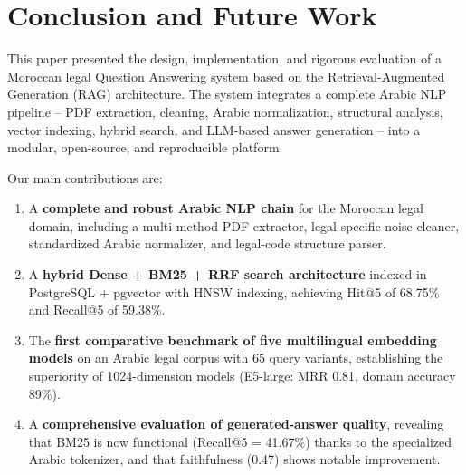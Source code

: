 \section{Conclusion and Future Work}
\label{sec:conclusion}

This paper presented the design, implementation, and rigorous evaluation of a
Moroccan legal Question Answering system based on the Retrieval-Augmented
Generation (RAG) architecture. The system integrates a complete Arabic NLP
pipeline -- PDF extraction, cleaning, Arabic normalization, structural
analysis, vector indexing, hybrid search, and LLM-based answer generation --
into a modular, open-source, and reproducible platform.

Our main contributions are:
\begin{enumerate}
  \item A \textbf{complete and robust Arabic NLP chain} for the Moroccan legal
        domain, including a multi-method PDF extractor, legal-specific noise
        cleaner, standardized Arabic normalizer, and legal-code structure
        parser.
  \item A \textbf{hybrid Dense + BM25 + RRF search architecture} indexed in
        PostgreSQL + pgvector with HNSW indexing, achieving Hit@5 of 68.75\%
        and Recall@5 of 59.38\%.
  \item The \textbf{first comparative benchmark of five multilingual embedding
        models} on an Arabic legal corpus with 65 query variants,
        establishing the superiority of 1024-dimension models (E5-large: MRR
        0.81, domain accuracy 89\%).
  \item A \textbf{comprehensive evaluation of generated-answer quality},
        revealing that BM25 is now functional (Recall@5 = 41.67\%) thanks to
        the specialized Arabic tokenizer, and that faithfulness (0.47) shows
        notable improvement.
\end{enumerate}

\begin{table}[t]
\centering
\caption{Comparison with existing solutions.}
\label{tab:comparison}
\small
{}
\end{table}

